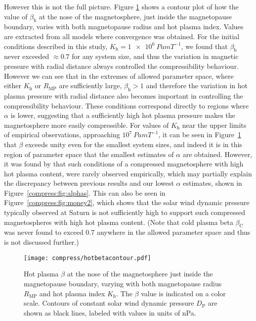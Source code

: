 However this is not the full picture. Figure \ref{compress:fig:hotbetacontour} shows a contour plot of how the value of $\beta_\mathrm{h}$ at the nose of the magnetosphere, just inside the magnetopause boundary, varies with both magnetopause radius and hot plasma index. Values are extracted from all models where convergence was obtained. For the initial conditions described in this study, $K_\mathrm{h}=\SI{1e6}{Pa m T^{-1}}$, we found that $\beta_\mathrm{h}$ never exceeded $ \approx 0.7$ for any system size, and thus the variation in magnetic pressure with radial distance always controlled the compressibility behaviour. However we can see that in the extremes of allowed parameter space, where either $K_\mathrm{h}$ or $R_\mathrm{MP}$ are sufficiently large, $\beta_\mathrm{h} > 1$ and therefore the variation in hot plasma pressure with radial distance also becomes important in controlling the compressibility behaviour. These conditions correspond directly to regions where $\alpha$ is lower, suggesting that a sufficiently high hot plasma pressure makes the magnetosphere more easily compressible. For values of $K_\mathrm{h}$ near the upper limits of empirical observations, approaching $10^7~\si{Pa m T^{-1}}$, it can be seen in Figure~\ref{compress:fig:hotbetacontour} that $\beta$ exceeds unity even for the smallest system sizes, and indeed it is in this region of parameter space that the smallest estimates of $\alpha$ are obtained. However, it was found by \citet{pilkington2015} that such conditions of a compressed magnetosphere with high hot plasma content, were rarely observed empirically, which may partially explain the discrepancy between previous results and our lowest $\alpha$ estimates, shown in Figure~\ref{compress:fig:alphas}. This can also be seen in Figure~\ref{compress:fig:money2}, which shows that the solar wind dynamic pressure typically observed at Saturn is not sufficiently high to support such compressed magnetospheres with high hot plasma content. (Note that cold plasma beta $\beta_\mathrm{C}$ was never found to exceed 0.7 anywhere in the allowed parameter space and thus is not discussed further.)
\begin{figure}
\centering
\noindent\texttt{[image: compress/hotbetacontour.pdf]}
\caption[Map of hot plasma $\beta$ just inside the magnetopause boundary in system size, $K_\mathrm{H}$ parameter space.]{Hot plasma $\beta$ at the nose of the magnetosphere just inside the magnetopause boundary, varying with both magnetopause radius $R_\mathrm{MP}$ and hot plasma index $K_\mathrm{h}$. The $\beta$ value is indicated on a color scale. Contours of constant solar wind dynamic pressure $D_\mathrm{P}$ are shown as black lines, labeled with values in units of nPa.}
\label{compress:fig:hotbetacontour}
\end{figure}

